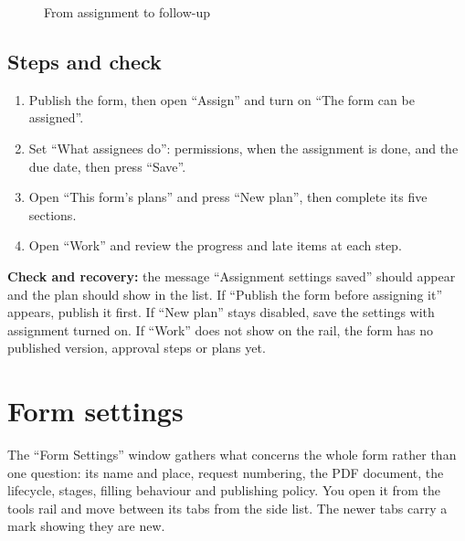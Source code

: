 \begin{figure}[H]
\centering
{}
\rclegend
\caption{From assignment to follow-up}
\label{fig:builder-forms-assign-work-flow}
\end{figure}

\subsection{Steps and check}
\begin{enumerate}
\item Publish the form, then open “Assign” and turn on “The form can be assigned”.
\item Set “What assignees do”: permissions, when the assignment is done, and the due date, then press “Save”.
\item Open “This form's plans” and press “New plan”, then complete its five sections.
\item Open “Work” and review the progress and late items at each step.
\end{enumerate}

\textbf{Check and recovery:} the message “Assignment settings saved” should appear and the plan should show in the list. If “Publish the form before assigning it” appears, publish it first. If “New plan” stays disabled, save the settings with assignment turned on. If “Work” does not show on the rail, the form has no published version, approval steps or plans yet.

\clearpage
\section{Form settings}
\label{sec:builder-feature-forms-settings}

The “Form Settings” window gathers what concerns the whole form rather than one question: its name and place, request numbering, the PDF document, the lifecycle, stages, filling behaviour and publishing policy. You open it from the tools rail and move between its tabs from the side list. The newer tabs carry a mark showing they are new.

